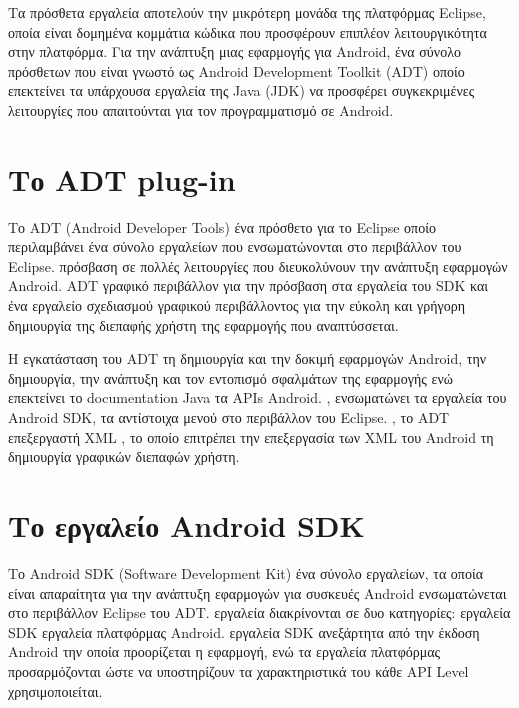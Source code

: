 \documentclass[12pt,twoside,openright]{report}
\begin{document}
Τα πρόσθετα εργαλεία αποτελούν την μικρότερη μονάδα της πλατφόρμας \lt Eclipse,  οποία είναι δομημένα κομμάτια κώδικα που προσφέρουν επιπλέον λειτουργικότητα στην πλατφόρμα. Για την ανάπτυξη μιας εφαρμογής για \lt Android,  ένα σύνολο πρόσθετων που είναι γνωστό ως \lt Android Development Toolkit (ADT)  οποίο επεκτείνει τα υπάρχουσα εργαλεία της \lt Java (JDK)   να προσφέρει συγκεκριμένες λειτουργίες που απαιτούνται για τον προγραμματισμό σε \lt Android.\gt
\section{Το \lt ADT plug-in\gt}
Το \lt ADT (Android Developer Tools)  ένα πρόσθετο για το \lt Eclipse  οποίο περιλαμβάνει ένα σύνολο εργαλείων που ενσωματώνονται στο περιβάλλον του \lt Eclipse.  πρόσβαση σε πολλές λειτουργίες που διευκολύνουν την ανάπτυξη εφαρμογών \lt Android.  \lt ADT  γραφικό περιβάλλον για την πρόσβαση στα εργαλεία του \lt SDK  και ένα εργαλείο σχεδιασμού γραφικού περιβάλλοντος για την εύκολη και γρήγορη δημιουργία της διεπαφής χρήστη της εφαρμογής που αναπτύσσεται.

Η εγκατάσταση του \lt ADT  τη δημιουργία και την δοκιμή εφαρμογών \lt Android,  την δημιουργία, την ανάπτυξη και τον εντοπισμό σφαλμάτων της εφαρμογής ενώ επεκτείνει το \lt documentation  \lt Java  τα \lt APIs  \lt Android. , ενσωματώνει τα εργαλεία του \lt Android SDK,  τα αντίστοιχα μενού στο περιβάλλον του \lt Eclipse. , το \lt ADT  επεξεργαστή \lt XML , το οποίο επιτρέπει την επεξεργασία των \lt XML  του \lt Android   τη δημιουργία γραφικών διεπαφών χρήστη.
\section{Το εργαλείο \lt Android SDK\gt}
Το \lt Android SDK (Software Development Kit)  ένα σύνολο εργαλείων, τα οποία είναι απαραίτητα για την ανάπτυξη εφαρμογών για συσκευές \lt Android  ενσωματώνεται στο περιβάλλον \lt Eclipse  του \lt ADT.  εργαλεία διακρίνονται σε δυο κατηγορίες: εργαλεία \lt SDK  εργαλεία πλατφόρμας \lt Android.  εργαλεία \lt SDK  ανεξάρτητα από την έκδοση \lt Android  την οποία προορίζεται η εφαρμογή, ενώ τα εργαλεία πλατφόρμας προσαρμόζονται ώστε να υποστηρίζουν τα χαρακτηριστικά του κάθε \lt API Level  χρησιμοποιείται.
\end{document}
